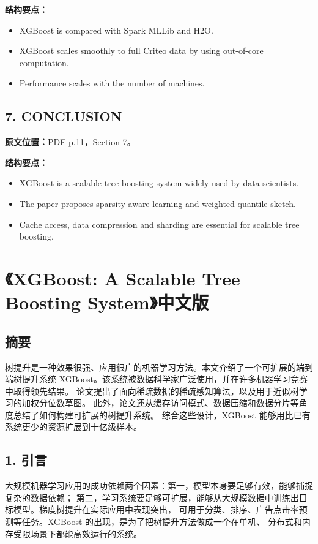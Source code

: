 \textbf{结构要点：}
\begin{itemize}
  \item XGBoost is compared with Spark MLLib and H2O.
  \item XGBoost scales smoothly to full Criteo data by using out-of-core computation.
  \item Performance scales with the number of machines.
\end{itemize}

\section{7. CONCLUSION}

\textbf{原文位置：}PDF p.11，Section 7。

\textbf{结构要点：}
\begin{itemize}
  \item XGBoost is a scalable tree boosting system widely used by data scientists.
  \item The paper proposes sparsity-aware learning and weighted quantile sketch.
  \item Cache access, data compression and sharding are essential for scalable tree boosting.
\end{itemize}

\chapter{《XGBoost: A Scalable Tree Boosting System》中文版}

\section{摘要}

树提升是一种效果很强、应用很广的机器学习方法。本文介绍了一个可扩展的端到端树提升系统
XGBoost。该系统被数据科学家广泛使用，并在许多机器学习竞赛中取得领先结果。
论文提出了面向稀疏数据的稀疏感知算法，以及用于近似树学习的加权分位数草图。
此外，论文还从缓存访问模式、数据压缩和数据分片等角度总结了如何构建可扩展的树提升系统。
综合这些设计，XGBoost 能够用比已有系统更少的资源扩展到十亿级样本。

\section{1. 引言}

大规模机器学习应用的成功依赖两个因素：第一，模型本身要足够有效，能够捕捉复杂的数据依赖；
第二，学习系统要足够可扩展，能够从大规模数据中训练出目标模型。梯度树提升在实际应用中表现突出，
可用于分类、排序、广告点击率预测等任务。XGBoost 的出现，是为了把树提升方法做成一个在单机、
分布式和内存受限场景下都能高效运行的系统。

